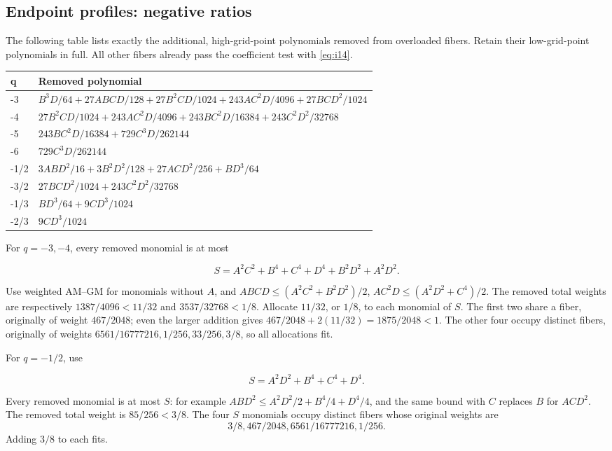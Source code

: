 \subsection{Endpoint profiles: negative ratios}

The following table lists exactly the additional, high-grid-point polynomials
removed from overloaded fibers. Retain their low-grid-point polynomials in
full. All other fibers already pass the coefficient test with \eqref{eq:i14}.

\begin{center}
\begin{tabular}{ll}
\toprule
q & Removed polynomial\\
\midrule
-3 & \(B^3D/64+27ABCD/128+27B^2CD/1024+243AC^2D/4096+27BCD^2/1024\)\\
-4 & \(27B^2CD/1024+243AC^2D/4096+243BC^2D/16384+243C^2D^2/32768\)\\
-5 & \(243BC^2D/16384+729C^3D/262144\)\\
-6 & \(729C^3D/262144\)\\
-1/2 & \(3ABD^2/16+3B^2D^2/128+27ACD^2/256+BD^3/64\)\\
-3/2 & \(27BCD^2/1024+243C^2D^2/32768\)\\
-1/3 & \(BD^3/64+9CD^3/1024\)\\
-2/3 & \(9CD^3/1024\)\\
\bottomrule
\end{tabular}
\end{center}

For \(q=-3,-4\), every removed monomial is at most

\[
S=A^2C^2+B^4+C^4+D^4+B^2D^2+A^2D^2.
\]

Use weighted AM--GM for monomials without \(A\), and
\(ABCD\le(A^2C^2+B^2D^2)/2\),
\(AC^2D\le(A^2D^2+C^4)/2\). The removed total weights are respectively
\(1387/4096<11/32\) and \(3537/32768<1/8\). Allocate \(11/32\), or
\(1/8\), to each monomial of \(S\). The first two share a fiber, originally
of weight \(467/2048\); even the larger addition gives
\(467/2048+2(11/32)=1875/2048<1\). The other four occupy distinct
fibers, originally of weights
\(6561/16777216,1/256,33/256,3/8\), so all allocations fit.

For \(q=-1/2\), use

\[
S=A^2D^2+B^4+C^4+D^4.
\]

Every removed monomial is at most \(S\): for example
\(ABD^2\le A^2D^2/2+B^4/4+D^4/4\), and the same bound with \(C\)
replaces \(B\) for \(ACD^2\). The removed total weight is
\(85/256<3/8\). The four \(S\) monomials occupy distinct fibers whose
original weights are
\[
3/8,467/2048,6561/16777216,1/256.
\]
Adding \(3/8\) to each fits.

